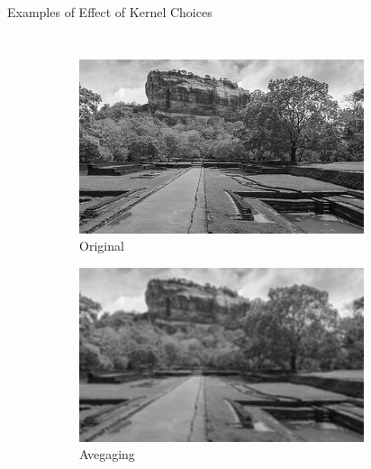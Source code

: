 \begin{frame}{Examples of Effect of Kernel Choices}
    \begin{columns}[t]
        \begin{figure}
            \centering
            \begin{subfigure}[b]{0.45\textwidth}
                \includegraphics[width=\textwidth]{./figures/sigiriya.jpg}
                \caption{Original}
                \label{sfi:sigiriya_original}
            \end{subfigure}
            \hspace{0.2cm}
            \begin{subfigure}[b]{0.45\textwidth}
                \includegraphics[width=\textwidth]{./figures/sigiriya_averaged.jpg}
                \caption{Avegaging}
                \label{sfi:sigiriya_averaged}
            \end{subfigure}\\
            \centering
            \begin{subfigure}[b]{0.45\textwidth}

\end{subfigure}
\end{figure}
\end{columns}
\end{frame}
